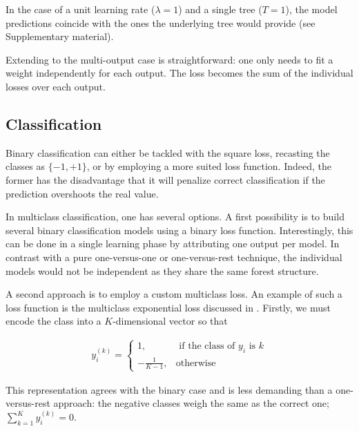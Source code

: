 \documentclass{article}
\begin{document}
In the case of a unit learning rate ($\lambda = 1$) and a single tree ($T=1$), 
the model predictions coincide with the ones the underlying tree would provide 
(see Supplementary material).

Extending to the multi-output case is straightforward: one only needs to fit a 
weight independently for each output. The loss becomes the sum of the 
individual losses over each output.

\subsection{Classification}
\label{subsec:classification}

Binary classification can either be tackled with the square loss, recasting the 
classes as $\{-1, +1\}$, or by employing a more suited loss function. Indeed, 
the former has the disadvantage that it will penalize correct classification if 
the prediction overshoots the real value.

In multiclass classification, one has several options. A first possibility is 
to build several binary classification models using a binary loss function. 
Interestingly, this can be done in a single learning phase by attributing one 
output per model. In contrast with a pure one-versus-one or one-versus-rest 
technique, the individual models would not be independent as they share the 
same forest structure.

A second approach is to employ a custom multiclass loss. An example of such a 
loss function is the multiclass exponential loss discussed in 
\cite{zhu2009multiadaboost}. Firstly, we must encode the class into a 
$K$-dimensional vector so that

\vspace*{-\baselineskip}
\begin{align}\label{eq:MEencode}
y_i^{(k)} = \begin{cases}
1, &\text{ if the class of } y_i \text{ is } k \\
-\frac{1}{K-1}, &\text{otherwise}
\end{cases}
\end{align}
\vspace*{-\baselineskip}

This representation agrees with the binary case and is less demanding than a 
one-versus-rest approach: the negative classes weigh the same as the correct 
one; $\sum_{k=1}^{K} y_i^{(k)} = 0$.
\end{document}
